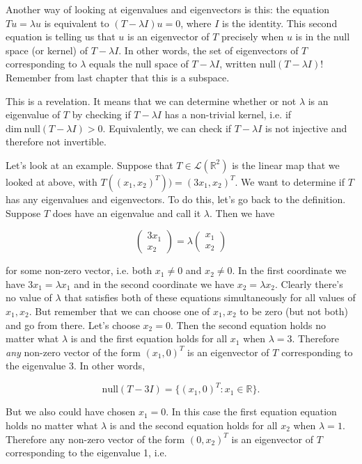 \documentclass[12pt]{article}
\begin{document}
\vskip 3mm
Another way of looking at eigenvalues and eigenvectors is this:  the equation $Tu = \lambda u$ is equivalent to $(T - \lambda I)u = 0$, where $I$ is the identity. This second equation is telling us that $u$ is an eigenvector of $T$ precisely when $u$ is in the null space (or kernel) of $T - \lambda I$. In other words, the set of eigenvectors of $T$ corresponding to $\lambda$ equals the null space of $T - \lambda I$, written $\textrm{null} (T - \lambda I)$! Remember from last chapter that this is a subspace.

This is a revelation. It means that we can determine whether or not $\lambda$ is an eigenvalue of $T$ by checking if $T - \lambda I$ has a non-trivial kernel, i.e. if $\textrm{dim} \:  \textrm{null} (T - \lambda I) > 0$. Equivalently, we can check if $T - \lambda I$ is not injective and therefore not invertible.


Let's look at an example. Suppose that $T \in \mathcal{L} (\mathbb{R}^2)$ is the linear map that we looked at above, with $T((x_1, x_2)^T)) = (3x_1, x_2)^T$. We want to determine if $T$ has any eigenvalues and eigenvectors. To do this, let's go back to the definition. Suppose $T$ does have an eigenvalue and call it $\lambda$. Then we have

\[ 
\begin{pmatrix}
3x_1 \\
x_2
\end{pmatrix}
=
\lambda \begin{pmatrix}
x_1 \\
x_2
\end{pmatrix}
\]

for some non-zero vector, i.e. both $x_1 \neq 0$ and $x_2 \neq 0$. In the first coordinate we have $3x_1 = \lambda x_1$ and in the second coordinate we have $x_2 = \lambda x_2$. Clearly there's no value of $\lambda$ that satisfies both of these equations simultaneously for all values of $x_1, x_2$. But remember that we can choose one of $x_1, x_2$ to be zero (but not both) and go from there. Let's choose $x_2 = 0$. Then the second equation holds no matter what $\lambda$ is and the first equation holds for all $x_1$ when $\lambda = 3$. Therefore \textit{any} non-zero vector of the form $(x_1, 0)^T$ is an eigenvector of $T$ corresponding to the eigenvalue 3. In other words,

$$\textrm{null} (T - 3I) = \{ (x_1, 0)^T : x_1 \in \mathbb{R} \}.$$

But we also could have chosen $x_1 = 0$. In this case the first equation equation holds no matter what $\lambda$ is and the second equation holds for all $x_2$ when $\lambda = 1$. Therefore any non-zero vector of the form $(0, x_2)^T$ is an eigenvector of $T$ corresponding to the eigenvalue 1, i.e.
\end{document}
